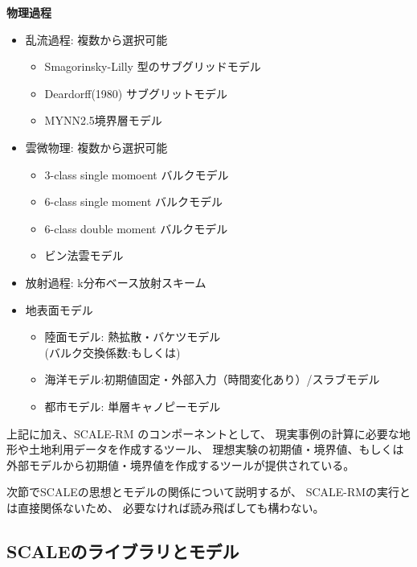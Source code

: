{\bf 物理過程}
\begin{itemize}
 \item 乱流過程: 複数から選択可能
   \begin{itemize}
    \item Smagorinsky-Lilly 型のサブグリッドモデル \citep{smagorinsky_1963,lilly_1962,Brown_etal_1994,Scotti_1993}
    \item Deardorff(1980) サブグリットモデル \citep{Deardorff_1980}
    \item MYNN2.5境界層モデル \citep{my_1982,nakanishi_2004}
   \end{itemize}
 \item 雲微物理: 複数から選択可能
   \begin{itemize}
    \item 3-class single momoent バルクモデル\citep{kessler_1969}
    \item 6-class single moment バルクモデル \citep{tomita_2008}
    \item 6-class double moment バルクモデル \citep{sn_2014}
    \item ビン法雲モデル \citep{suzuki_etal_2010}
   \end{itemize}
 \item 放射過程: k分布ベース放射スキーム\citep{sekiguchi_2008}
 \item 地表面モデル
  \begin{itemize}
   \item 陸面モデル: 熱拡散・バケツモデル\\
         (バルク交換係数:\citep{beljaars_1991,wilson_2001}もしくは\citep{uno_1995})
   \item 海洋モデル:初期値固定・外部入力（時間変化あり）/スラブモデル
   \item 都市モデル: 単層キャノピーモデル \citep{kusaka_2001}
  \end{itemize}
\end{itemize}

上記に加え、SCALE-RM のコンポーネントとして、
現実事例の計算に必要な地形や土地利用データを作成するツール、
理想実験の初期値・境界値、もしくは外部モデルから初期値・境界値を作成するツールが提供されている。

次節でSCALEの思想とモデルの関係について説明するが、
SCALE-RMの実行とは直接関係ないため、
必要なければ読み飛ばしても構わない。


\subsection{SCALEのライブラリとモデル}

